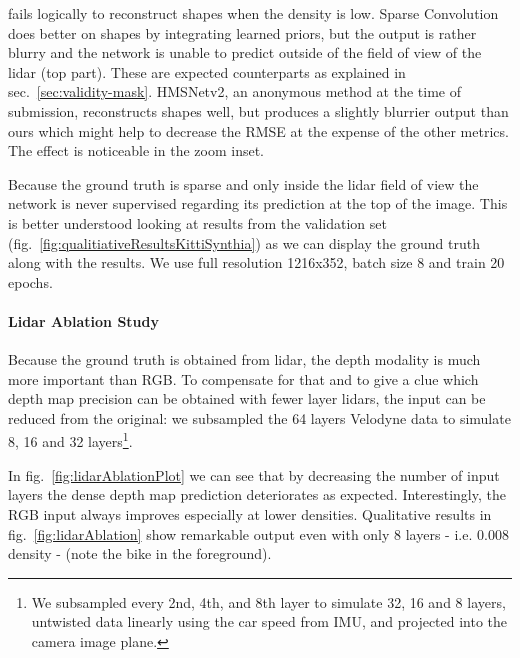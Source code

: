 \documentclass[10pt,twocolumn,letterpaper]{article}
\begin{document}
fails logically to reconstruct shapes when the density is low.
Sparse Convolution \cite{uhrig2017sparsity} does better on shapes by integrating learned priors, but the output is rather blurry and the network is unable to predict
outside of the field of view of the lidar (top part). These are expected counterparts as explained in sec.~\ref{sec:validity-mask}.
HMSNetv2, an anonymous method at the time of submission, reconstructs shapes well, but produces a slightly blurrier output than ours which might help to decrease the RMSE at the expense of the other metrics. The effect is noticeable in the zoom inset. 


Because the ground truth is sparse and only inside the lidar field of view the network is never supervised regarding its prediction at the top of the image. This is better understood looking at results from the validation set (fig.~\ref{fig:qualitiativeResultsKittiSynthia}) as we can display the ground truth along with the results. 
We use full resolution 1216x352, batch size 8 and train 20 epochs.

\paragraph{Lidar Ablation Study}
\label{sec:lidarAblationStudy}
Because the ground truth is obtained from lidar, the depth modality is much more important than RGB. To compensate for that and to give a clue which depth map precision can be obtained with fewer layer lidars, the input can be reduced from the original: we subsampled the 64 layers Velodyne data to simulate 8, 16 and 32 layers\footnote{We subsampled every 2nd, 4th, and 8th layer to simulate 32, 16 and 8 layers, untwisted data linearly using the car speed from IMU, and projected into the camera image plane.}.

In fig.~\ref{fig:lidarAblationPlot} we can see that by decreasing the number of input layers the dense depth map prediction deteriorates as expected. Interestingly, the RGB input always improves especially at lower densities.
Qualitative results in fig.~\ref{fig:lidarAblation} show remarkable output even with only 8 layers - i.e. $0.008$ density - (note the bike in the foreground).
\end{document}
